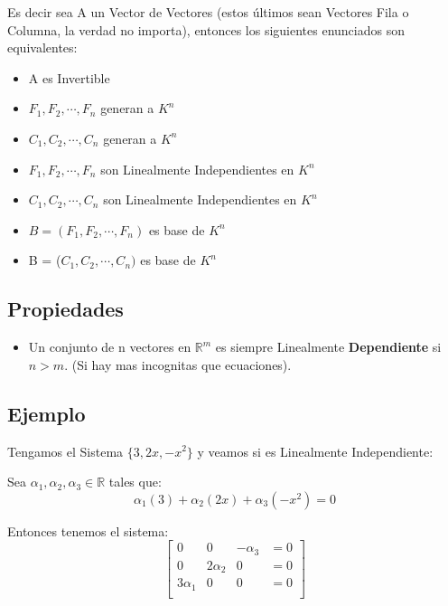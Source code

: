 \documentclass[12pt]{report}							    %
\begin{document}
        Es decir sea A un Vector de Vectores (estos últimos sean Vectores Fila
        o Columna, la verdad no importa), entonces los siguientes
        enunciados son equivalentes:

        \begin{itemize}
            \item A es Invertible
            \item $F_1, F_2, \cdots ,F_n$ generan a $K^n$
            \item $C_1, C_2, \cdots, C_n$ generan a $K^n$
            \item $F_1, F_2, \cdots, F_n$ son Linealmente Independientes en $K^n$
            \item $C_1, C_2, \cdots, C_n$ son Linealmente Independientes en $K^n$
            \item $B = (F_1, F_2, \cdots, F_n)$ es base de $K^n$
            \item B = ($C_1, C_2, \cdots, C_n)$ es base de $K^n$
        \end{itemize}
        

        \subsection{Propiedades}
        \begin{itemize}
            \item Un conjunto de n vectores en $\mathbb{R}^m$ es siempre Linealmente
             \textbf{Dependiente} si $n > m$. (Si hay mas incognitas que ecuaciones).
        \end{itemize}

        \subsection{Ejemplo}

            Tengamos el Sistema $\{3,2x,-x^2\}$ y veamos si es Linealmente Independiente:

            Sea $\alpha_1, \alpha_2, \alpha_3 \in \mathbb{R}$ tales que:
            \begin{equation*}
                \alpha_1(3) + \alpha_2(2x) + \alpha_3(-x^2) = 0
            \end{equation*}

            Entonces tenemos el sistema:
            \begin{equation*}
                \begin{bmatrix}
                    0 & 0 & -\alpha_3 & = 0\\
                    0 & 2\alpha_2 & 0 & = 0\\
                    3\alpha_1 & 0 & 0 & = 0\\
                \end{bmatrix}
            \end{equation*}
\end{document}
